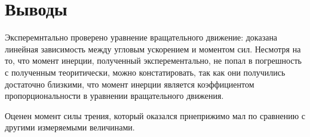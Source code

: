 \section{Выводы}

Эксперемнтально проверено уравнение вращательного движение:
доказана линейная зависимость между угловым ускорением и моментом сил.
Несмотря на то, что момент инерции, полученный эксперементально,
не попал в погрешность с полученным теоритически, можно констатировать,
так как они получились достаточно близкими, что момент инерции
является коэффициентом пропорциональности в уравнении вращательного движения.

Оценен момент силы трения, который оказался прнеприжимо мал по
сравнению с другими измеряемыми величинами.
